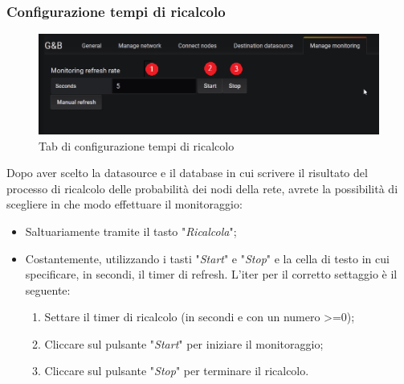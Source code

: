 \subsubsection{Configurazione tempi di ricalcolo}
\begin{figure} [H]
	\centering
	\includegraphics[scale=0.55]{Img/monitoring} 
	\caption{Tab di configurazione tempi di ricalcolo} \label{} 
\end{figure} 
Dopo aver scelto la datasource e il database in cui scrivere il risultato del processo di ricalcolo delle probabilità dei nodi della rete, avrete la possibilità di scegliere in che modo effettuare il monitoraggio:
\begin{itemize}
	\item Saltuariamente tramite il tasto "\emph{Ricalcola}";
	\item Costantemente, utilizzando i tasti "\emph{Start}" e "\emph{Stop}" e la cella di testo in cui specificare, in secondi, il timer di refresh. L'iter per il corretto settaggio è il seguente:
		\begin{enumerate}
				\item Settare il timer di ricalcolo (in secondi e con un numero >=0);
				\item Cliccare sul pulsante "\emph{Start}" per iniziare il monitoraggio;
				\item Cliccare sul pulsante "\emph{Stop}" per terminare il ricalcolo.
		\end{enumerate}
\end{itemize}